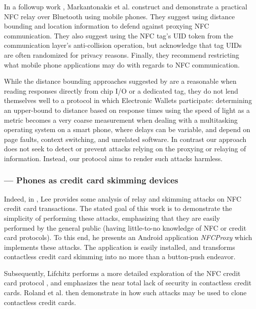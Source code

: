 In a followup work \cite{markantonakis2012practical}, Markantonakis et al. construct and demonstrate a practical NFC relay over Bluetooth using mobile phones.
They suggest using distance bounding and location information to defend against proxying NFC communication.
They also suggest using the NFC tag's UID token from the communication layer's anti-collision operation,
    but acknowledge that tag UIDs are often randomized for privacy reasons.
Finally, they recommend restricting what mobile phone applications may do with regards to NFC communication.

While the distance bounding approaches suggested by \cite{francis2010practical, markantonakis2012practical, Drimer:2007:KYE:1362903.1362910}
    are a reasonable when reading responses directly from chip I/O or a dedicated tag,
    they do not lend themselves well to a protocol in which Electronic Wallets participate:
determining an upper-bound to distance based on response times using the speed of light as a metric becomes a very coarse measurement
    when dealing with a multitasking operating system on a smart phone, where delays can be variable, and depend on page faults, context switching, and unrelated software.
In contrast our approach does not seek to detect or prevent attacks relying on the proxying or relaying of information.
Instead, our protocol aims to render such attacks harmless.


\subsubsection*{--- Phones as credit card skimming devices}

Indeed, in \cite{lee2012nfc}, Lee provides some analysis of relay and skimming attacks on NFC credit card transactions.
The stated goal of this work is to demonstrate the simplicity of performing these attacks,
    emphasizing that they are easily performed by the general public (having little-to-no knowledge of NFC or credit card protocols).
To this end, he presents an Android application \emph{NFCProxy} \cite{NFCProxy} which implements these attacks.
The application is easily installed, and transforms contactless credit card skimming into no more than a button-push endeavor.

Subsequently, Lifchitz performs a more detailed exploration of the NFC credit card protocol \cite{lifchitz2012hacking},
    and emphasizes the near total lack of security in contactless credit cards.
Roland et al. then demonstrate in \cite{roland2013cloning} how such attacks may be used to clone contactless credit cards.


